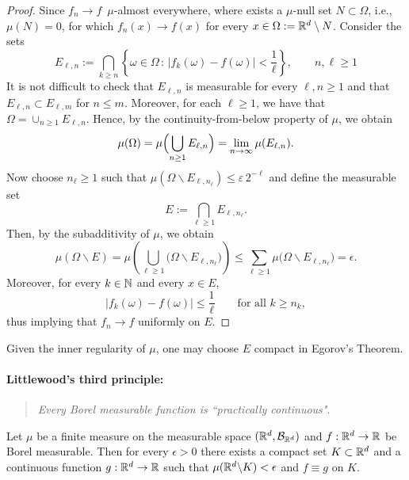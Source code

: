 \begin{proof}
	Since $f_n\to f$\, $\mu$-almost everywhere, where exists a $\mu$-null set $N\subset\Omega$, i.e., $\mu(N)=0$, for which $f_n(x)\to f(x)$ for every $x\in \Omega:=\mathbb R^d\setminus N$. Consider the sets
	\[
		E_{\ell,n} := \bigcap_{k\ge n} \left\{ \omega\in \Omega\,:\, |f_k(\omega)-f(\omega)| < \frac{1}{\ell}\right\},\qquad n,\ell\ge 1
	\]
	It is not difficult to check that $E_{\ell,n}$ is measurable for every $\ell,n\ge 1$ and that $E_{\ell,n}\subset E_{\ell,m}$ for $n\le m$. Moreover, for each $\ell\ge 1$, we have that $\Omega = \cup_{n\ge 1} E_{\ell,n}$. Hence, by the continuity-from-below property of $\mu$, we obtain
	\[
		\mu(\Omega) = \mu\Bigl(\bigcup_{n\ge 1} E_{\ell,n}\Bigr) = \lim_{n\to\infty} \mu(E_{\ell,n}).
	\]
	Now choose $n_\ell\ge 1$ such that $\mu(\Omega\backslash E_{\ell,n_\ell}) \le \varepsilon\,2^{-\ell}$ and define the measurable set
	\[
		E := \bigcap_{\ell\ge 1} E_{\ell,n_\ell}.
	\]
	Then, by the subadditivity of $\mu$, we obtain
	\[
		\mu(\Omega\backslash E) = \mu\left(\bigcup_{\ell\ge 1}\bigl(\Omega\backslash E_{\ell,n_\ell}\bigr)\right) \le \sum_{\ell\ge 1} \mu\bigl(\Omega\backslash E_{\ell,n_\ell}\bigr) = \epsilon.
	\]
	Moreover, for every $k \in \mathbb N$ and every $x \in E$,
	\[
		|f_k(\omega) - f(\omega)| \leq \frac{1}{\ell}\qquad\text{for all $k\ge n_k$},
	\]
	thus implying that $f_n \to f$ uniformly on $E$.
\end{proof}

\begin{remark}
	Given the inner regularity of $\mu$, one may choose $E$ compact in Egorov's Theorem. 
\end{remark}

\paragraph{Littlewood's third principle:} 
\begin{quotation}
	\emph{Every Borel measurable function is ``practically continuous"}.	
\end{quotation}

\begin{theorem}
    Let $\mu$ be a finite measure on the measurable space $(\mathbb R^d, \mathcal B_{\mathbb R^d})$ and $f: \mathbb R^d \to \mathbb R$ be Borel measurable. 
	Then for every $\epsilon > 0$ there exists a compact set $K \subset \mathbb R^d$ and a continuous function $g: \mathbb R^d \to \mathbb R$ such that $\mu(\mathbb R^d \backslash K) < \epsilon$ and $f \equiv g$ on $K$.
\end{theorem}


